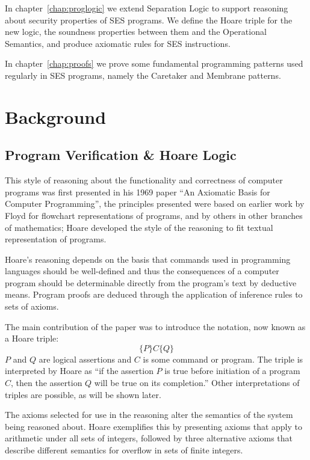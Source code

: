 \documentclass[a4paper,notitlepage]{report}
\begin{document}
  In chapter~\ref{chap:proglogic} we extend Separation Logic to support
  reasoning about security properties of SES programs. We define the Hoare
  triple for the new logic, the soundness properties between them and the
  Operational Semantics, and produce axiomatic rules for SES instructions.

  In chapter~\ref{chap:proofs} we prove some fundamental programming patterns
  used regularly in SES programs, namely the Caretaker and Membrane patterns.

\chapter{Background}
\section{Program Verification \& Hoare Logic}
  This style of reasoning about the functionality and correctness of computer
  programs was first presented in his 1969 paper ``An Axiomatic Basis for
  Computer Programming''\cite{Hoare1969Axiom}, the principles presented were
  based on earlier work by Floyd\cite{floyd1967assigning} for flowchart
  representations of programs, and by others in other branches of mathematics;
  Hoare developed the style of the reasoning to fit textual representation of
  programs.

  Hoare's reasoning depends on the basis that commands used in programming
  languages should be well-defined and thus the consequences of a computer
  program should be determinable directly from the program's text by deductive
  means. Program proofs are deduced through the application of inference rules
  to sets of axioms.

  The main contribution of the paper was to introduce the notation, now known as
  a Hoare triple:
    \[ \{P\} C \{Q\} \]
  $P$ and $Q$ are logical assertions and $C$ is some command or program. The
  triple is interpreted by Hoare as ``if the assertion $P$ is true before
  initiation of a program $C$, then the assertion $Q$ will be true on its
  completion.'' Other interpretations of triples are possible, as will be shown
  later.

  The axioms selected for use in the reasoning alter the semantics of the system
  being reasoned about. Hoare exemplifies this by presenting axioms that apply
  to arithmetic under all sets of integers, followed by three alternative axioms
  that describe different semantics for overflow in sets of finite integers.
\end{document}
